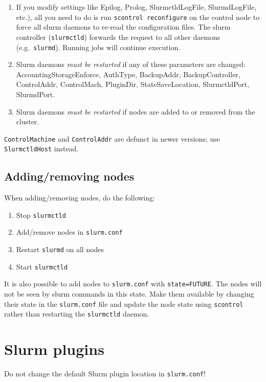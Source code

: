 \begin{enumerate}
  \item If you modify settings like Epilog, Prolog, SlurmctldLogFile, SlurmdLogFile, etc.), all you need to do is run \texttt{scontrol reconfigure} on the control node to force all slurm daemons to re-read the configuration files. The slurm controller (\texttt{slurmctld}) forwards the request to all other daemons (e.g.\ \texttt{slurmd}). Running jobs will continue execution. 
  \item Slurm daemons \emph{must be restarted} if any of these parameters are changed: AccountingStorageEnforce, AuthType, BackupAddr, BackupController, ControlAddr, ControlMach, PluginDir, StateSaveLocation, SlurmctldPort, SlurmdPort.
  \item Slurm daemons \emph{must be restarted} if nodes are added to or removed from the cluster.
\end{enumerate}

\texttt{ControlMachine} and \texttt{ControlAddr} are defunct in newer versions; use \texttt{SlurmctldHost} instead.

\subsection{Adding/removing nodes} \label{subsec:addnodes}

When adding/removing nodes, do the following:
\begin{enumerate}
  \item Stop \texttt{slurmctld}
  \item Add/remove nodes in \texttt{slurm.conf}
  \item Restart \texttt{slurmd} on all nodes
  \item Start \texttt{slurmctld}
\end{enumerate}

\noindent It is also possible to add nodes to \texttt{slurm.conf} with \texttt{state=FUTURE}. The nodes will not be seen by slurm commands in this state. Make them available by changing their state in the \texttt{slurm.conf} file and update the node state using \texttt{scontrol} rather than restarting the \texttt{slurmctld} daemon.

\section{Slurm plugins} \label{sec:slurmplugins}

Do not change the default Slurm plugin location in \texttt{slurm.conf}!

